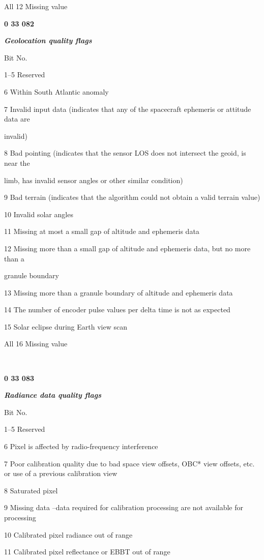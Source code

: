 All 12 Missing value

\textbf{0 33 082}

\emph{\textbf{Geolocation quality flags}}

Bit No.

1--5 Reserved

6 Within South Atlantic anomaly

7 Invalid input data (indicates that any of the spacecraft ephemeris or attitude data are

invalid)

8 Bad pointing (indicates that the sensor LOS does not intersect the geoid, is near the

limb, has invalid sensor angles or other similar condition)

9 Bad terrain (indicates that the algorithm could not obtain a valid terrain value)

10 Invalid solar angles

11 Missing at most a small gap of altitude and ephemeris data

12 Missing more than a small gap of altitude and ephemeris data, but no more than a

granule boundary

13 Missing more than a granule boundary of altitude and ephemeris data

14 The number of encoder pulse values per delta time is not as expected

15 Solar eclipse during Earth view scan

All 16 Missing value

\textbf{\\
}

\textbf{0 33 083}

\emph{\textbf{Radiance data quality flags}}

Bit No.

1--5 Reserved

6 Pixel is affected by radio-frequency interference

7 Poor calibration quality due to bad space view offsets, OBC* view offsets, etc. or use of a previous calibration view

8 Saturated pixel

9 Missing data --data required for calibration processing are not available for processing

10 Calibrated pixel radiance out of range

11 Calibrated pixel reflectance or EBBT out of range


